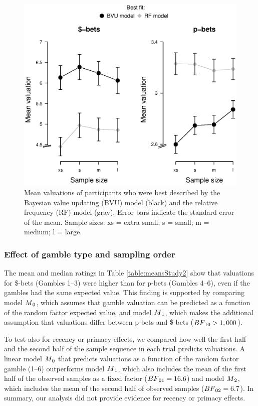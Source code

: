 \documentclass[a4paper,man, natbib]{apa6} %
\begin{document}
\begin{figure}[htbp] 
  \centering
\includegraphics[width=.8\linewidth, keepaspectratio]{qual_study1.eps}
  \caption{Mean valuations of participants who were best described by the Bayesian value updating (BVU) model (black) and the relative frequency (RF) model (gray).
   Error bars indicate the standard error of the mean. Sample sizes: xs = extra small; s = small; m = medium; l = large.}
  \label{fig:qual1}
\end{figure}

\subsubsection{Effect of gamble type and sampling order}
The mean and median ratings in Table \ref{table:meansStudy2} show that valuations for \$-bets (Gambles 1--3) were higher than for p-bets (Gambles 4--6), even if the gambles had the same expected value. This finding is supported by comparing model $M\textsubscript{0}$, which assumes that gamble valuation can be predicted as a function of the random factor expected value, and model $M\textsubscript{1}$, which makes the additional assumption that valuations differ between p-bets and \$-bets ($BF\textsubscript{10} > 1,000$).

To test also for recency or primacy effects, we compared how well the first half and the second half of the sample sequence in each trial predicts valuations. A linear model $M\textsubscript{0}$ that predicts valuations as a function of the random factor gamble (1--6) outperforms model $M\textsubscript{1}$, which also includes the mean of the first half of the observed samples as a fixed factor ($BF\textsubscript{01} = 16.6$) and model $M\textsubscript{2}$, which includes the mean of the second half of observed samples ($BF\textsubscript{02} = 6.7$). In summary, our analysis did not provide evidence for recency or primacy effects.
\end{document}
